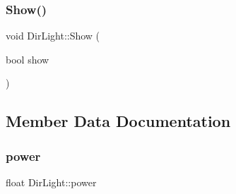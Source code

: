 \hypertarget{class_dir_light_a2158012fdbe3dba5f83c9d2e67cceab9}{}\label{class_dir_light_a2158012fdbe3dba5f83c9d2e67cceab9} 
\subsubsection{\texorpdfstring{Show()}{Show()}}
{\footnotesize\ttfamily void Dir\+Light\+::\+Show (\begin{DoxyParamCaption}\item[{bool}]{show }\end{DoxyParamCaption})}



\subsection{Member Data Documentation}
\hypertarget{class_dir_light_a8d4ab566796b262a9321bdb6a8ade460}{}\label{class_dir_light_a8d4ab566796b262a9321bdb6a8ade460} 
\subsubsection{\texorpdfstring{power}{power}}
{\footnotesize\ttfamily float Dir\+Light\+::power}


